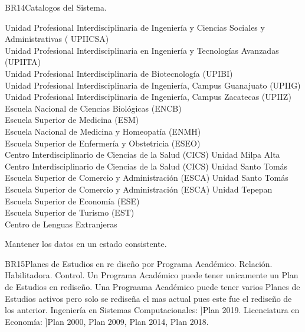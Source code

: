 \begin{BussinesRule}{BR14}{Catalogos del Sistema.}
\begin{itemize}
            Unidad Profesional Interdisciplinaria de Ingeniería y Ciencias Sociales y Administrativas ( UPIICSA) \\
            Unidad Profesional Interdisciplinaria en Ingeniería y Tecnologías Avanzadas (UPIITA) \\
            Unidad Profesional Interdisciplinaria de Biotecnología (UPIBI) \\
            Unidad Profesional Interdisciplinaria de Ingeniería, Campus Guanajuato (UPIIG) \\
            Unidad Profesional Interdisciplinaria de Ingeniería, Campus Zacatecas (UPIIZ) \\
            Escuela Nacional de Ciencias Biológicas (ENCB) \\
            Escuela Superior de Medicina (ESM) \\
            Escuela Nacional de Medicina y Homeopatía (ENMH) \\
            Escuela Superior de Enfermería y Obstetricia (ESEO) \\
            Centro Interdisciplinario de Ciencias de la Salud (CICS) Unidad Milpa Alta \\
            Centro Interdisciplinario de Ciencias de la Salud (CICS) Unidad Santo Tomás \\
            Escuela Superior de Comercio y Administración (ESCA) Unidad Santo Tomás \\
            Escuela Superior de Comercio y Administración (ESCA) Unidad Tepepan \\
            Escuela Superior de Economía (ESE) \\
            Escuela Superior de Turismo (EST) \\
            Centro de Lenguas Extranjeras
    \end{itemize}
    \BRitem[Motivación: ]Mantener los datos en un estado consistente.
\end{BussinesRule}
\begin{BussinesRule}{BR15}{Planes de Estudios en re diseño por Programa Académico.}
    \BRitem[Tipo:] Relación.
    \BRitem[Clase:] Habilitadora.
    \BRitem[Nivel:] Control.
    \BRitem[Descripción:] Un Programa Académico puede tener unicamente un Plan de Estudios en rediseño.
    \BRitem[Motivación: ]Una Prograama Académico puede tener varios Planes de Estudios activos pero solo se rediseña el mas actual pues este fue el rediseño de los anterior.
     Ingeniería en Sistemas Computacionales: ]Plan 2019.
     Licenciatura en Economía: ]Plan 2000, Plan 2009, Plan 2014, Plan 2018.
\end{BussinesRule}
